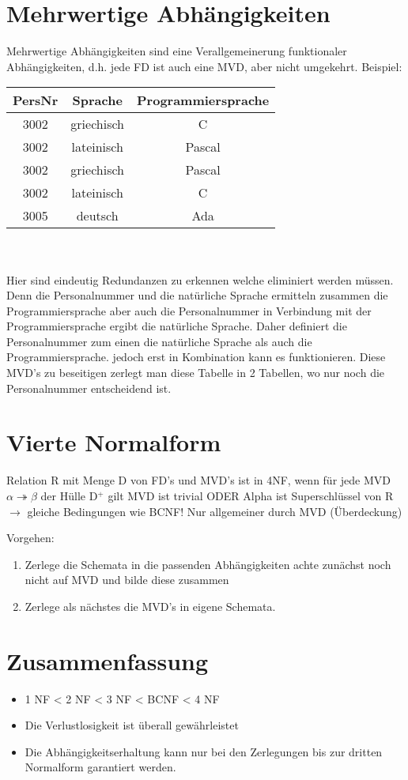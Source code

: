 \section{Mehrwertige Abhängigkeiten}
Mehrwertige Abhängigkeiten sind eine Verallgemeinerung funktionaler Abhängigkeiten, d.h. jede FD ist auch eine MVD, aber nicht umgekehrt. Beispiel:\\
\begin{tabular}{|c|c|c|}
\hline PersNr & Sprache & Programmiersprache \\ 
\hline 3002 & griechisch & C \\ 
3002 & lateinisch & Pascal \\ 
 3002 & griechisch & Pascal \\ 
 3002 & lateinisch & C \\ 
 3005 & deutsch & Ada \\ 
 \hline
\end{tabular} \\ \qquad\\
Hier sind eindeutig Redundanzen zu erkennen welche eliminiert werden müssen. Denn die Personalnummer und die natürliche Sprache ermitteln zusammen die Programmiersprache aber auch die Personalnummer in Verbindung mit der Programmiersprache ergibt die natürliche Sprache. Daher definiert die Personalnummer zum einen die natürliche Sprache als auch die Programmiersprache. jedoch erst in Kombination kann es funktionieren. Diese MVD's zu beseitigen zerlegt man diese Tabelle in 2 Tabellen, wo nur noch die Personalnummer entscheidend ist. 

\section{Vierte Normalform}

Relation R mit Menge D von FD’s und MVD’s ist in 4NF, wenn für jede MVD $\alpha \twoheadrightarrow \beta$ der Hülle D$^{+}$ gilt
MVD ist trivial ODER
Alpha ist Superschlüssel von R
$\rightarrow$ gleiche Bedingungen wie BCNF! Nur allgemeiner durch MVD (Überdeckung)

Vorgehen:

\begin{enumerate}
\item Zerlege die Schemata in die passenden Abhängigkeiten
\subitem achte zunächst noch nicht auf MVD und bilde diese zusammen 
\item Zerlege als nächstes die MVD's in eigene Schemata. 
\end{enumerate}

\section{Zusammenfassung}
\begin{itemize}
\item 1 NF < 2 NF < 3 NF < BCNF < 4 NF
\item Die Verlustlosigkeit ist überall gewährleistet
\item Die Abhängigkeitserhaltung kann nur bei den Zerlegungen bis zur dritten Normalform garantiert werden. 
\end{itemize}
